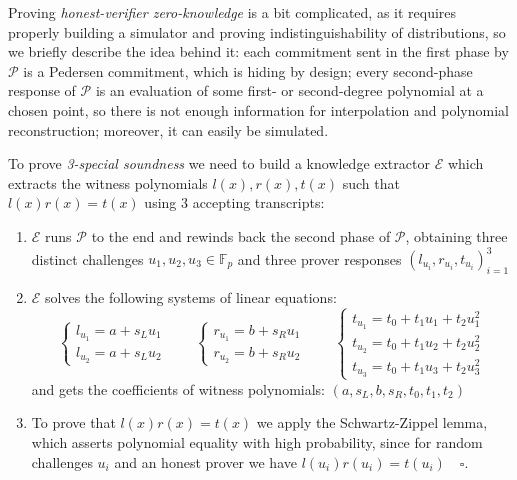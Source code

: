 \documentclass[../../book.tex]{subfiles}
\begin{document}
Proving \textit{honest-verifier zero-knowledge} is a bit complicated, as it requires properly building a simulator and proving indistinguishability of distributions, so we briefly describe the idea behind it: each commitment sent in the first phase by $\mathcal{P}$ is a Pedersen commitment, which is hiding by design; every second-phase response of $\mathcal{P}$ is an evaluation of some first- or second-degree polynomial at a chosen point, so there is not enough information for interpolation and polynomial reconstruction; moreover, it can easily be simulated.

To prove \textit{3-special soundness} we need to build a knowledge extractor $\mathcal{E}$ which extracts the witness polynomials $l(x), r(x), t(x)$ such that $l(x)r(x) = t(x)$ using 3 accepting transcripts:
\begin{enumerate}
    \item $\mathcal{E}$ runs $\mathcal{P}$ to the end and rewinds back the second phase of $\mathcal{P}$, obtaining three distinct challenges $u_1, u_2, u_3 \in \mathbb{F}_p$ and three prover responses $(l_{u_i}, r_{u_i}, t_{u_i})_{i=1}^3$
    \item $\mathcal{E}$ solves the following systems of linear equations:
    \begin{equation*}
        \begin{cases}
            l_{u_1} = a + s_L u_1 \\
            l_{u_2} = a + s_L u_2
        \end{cases}
        \qquad
        \begin{cases}
            r_{u_1} = b + s_R u_1 \\
            r_{u_2} = b + s_R u_2
        \end{cases}
        \qquad
        \begin{cases}
            t_{u_1} = t_0 + t_1 u_1 + t_2 u_1^2 \\
            t_{u_2} = t_0 + t_1 u_2 + t_2 u_2^2 \\
            t_{u_3} = t_0 + t_1 u_3 + t_2 u_3^2
        \end{cases}
    \end{equation*}
    and gets the coefficients of witness polynomials: $(a, s_L, b, s_R, t_0, t_1, t_2)$
    \item To prove that $l(x)r(x) = t(x)$ we apply the Schwartz-Zippel lemma, which asserts polynomial equality with high probability, since for random challenges $u_i$ and an honest prover we have $l(u_i)r(u_i) = t(u_i) \quad \square$.
\end{enumerate}
\end{document}

